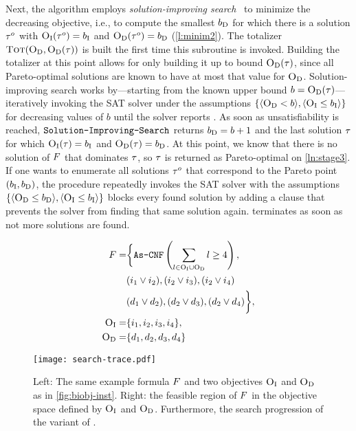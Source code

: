 Next, the algorithm employs \emph{solution-improving search}~\autocites{handbook2-maxsat,DBLP:journals/jsat/BerreP10,DBLP:journals/jsat/EenS06} to minimize the decreasing objective, i.e., to compute the smallest $b_{\text{D}}$ for which there is a solution $\tau^o$ with $\textsc{O}_{\text{I}}(\tau^o) = b_{\text{I}}$ and $\textsc{O}_{\text{D}}(\tau^o) = b_{\text{D}}$ (\cref{l:minim2}).
The totalizer $\textsc{Tot}(\textsc{O}_{\text{D}}, \textsc{O}_{\text{D}}(\tau))$ is built the first time this subroutine is invoked.
Building the totalizer at this point allows for only building it up to bound $\textsc{O}_{\text{D}}(\tau)$, since all Pareto-optimal solutions are known to have at most that value for $\textsc{O}_{\text{D}}$.
Solution-improving search works by---starting from the known upper bound $b=\textsc{O}_{\text{D}}(\tau)$---iteratively invoking the SAT solver under the assumptions $\{\langle \textsc{O}_{\text{D}} < b \rangle, \langle \textsc{O}_{\text{I}} \leq b_{\text{I}} \rangle\}$ for decreasing values of $b$ until the solver reports \unsat{}.
As soon as unsatisfiability is reached, $\texttt{Solution-\allowbreak{}Improving-\allowbreak{}Search}$ returns $b_{\text{D}}=b+1$ and the last solution $\tau$ for which $\textsc{O}_{\text{I}}(\tau) = b_{\text{I}}$ and $\textsc{O}_{\text{D}}(\tau) = b_{\text{D}}$.
At this point, we know that there is no solution of $F$ that dominates $\tau$, so $\tau$ is returned as Pareto-optimal on \cref{ln:stage3}.
If one wants to enumerate all solutions $\tau^o$ that correspond to the Pareto point $(b_{\text{I}},b_{\text{D}})$, the \E{} procedure repeatedly invokes the SAT solver with the assumptions $\{\langle \textsc{O}_{\text{D}} \leq b_{\text{D}} \rangle, \langle \textsc{O}_{\text{I}} \leq b_{\text{I}} \rangle\}$ blocks every found solution by adding a clause that prevents the solver from finding that same solution again.
\E{} terminates as soon as not more solutions are found.

\begin{figure}
  \begin{minipage}{0.377\textwidth}
    \small
    \begin{align*}
      F = &\bigg\{ \texttt{As-CNF}\left(\sum_ {l \in \textsc{O}_{\text{I}} \cup \textsc{O}_{\text{D}}} l \geq 4 \right), \\
        &(i_1 \lor i_2), (i_2 \lor i_3), (i_2 \lor i_4) \\
        &(d_1 \lor d_2), (d_2 \lor d_3), (d_2 \lor d_4) \bigg\}, \\
      \textsc{O}_{\text{I}} =&\{ i_1, i_2, i_3, i_4 \}, \\
      \textsc{O}_{\text{D}} =&\{ d_1, d_2, d_3, d_4 \} 
    \end{align*}
  \end{minipage}
  \;
  \begin{minipage}{0.605\textwidth}
    \texttt{[image: search-trace.pdf]}
  \end{minipage}
  \caption{Left: The same example formula $F$ and two objectives $\textsc{O}_{\text{I}}$ and $\textsc{O}_{\text{D}}$ as in \cref{fig:biobj-inst}.
    Right: the feasible region of $F$ in the objective space defined by $\textsc{O}_{\text{I}}$ and $\textsc{O}_{\text{D}}$.
    Furthermore, the search progression of the \satunsat{} variant of \algname{}.\label{fig:search-trace}}
\end{figure}

